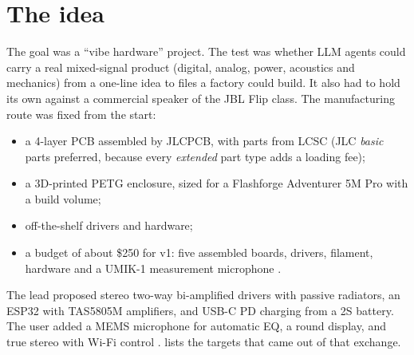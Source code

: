 \section{The idea}\label{sec:idea}

The goal was a ``vibe hardware'' project. The test was whether LLM agents could carry a real mixed-signal product (digital, analog, power, acoustics and mechanics) from a one-line idea to files a factory could build. It also had to hold its own against a commercial speaker of the JBL Flip class. The manufacturing route was fixed from the start:
\begin{itemize}
  \item a 4-layer PCB assembled by JLCPCB, with parts from LCSC (JLC \emph{basic} parts preferred, because every \emph{extended} part type adds a loading fee);
  \item a 3D-printed PETG enclosure, sized for a Flashforge Adventurer 5M Pro with a  build volume;
  \item off-the-shelf drivers and hardware;
  \item a budget of about \$250 for v1: five assembled boards, drivers, filament, hardware and a UMIK-1 measurement microphone .
\end{itemize}

The lead proposed stereo two-way bi-amplified drivers with passive radiators, an ESP32 with TAS5805M amplifiers, and USB-C PD charging from a 2S battery. The user added a MEMS microphone for automatic EQ, a round display, and true stereo with Wi-Fi control .  lists the targets that came out of that exchange.

